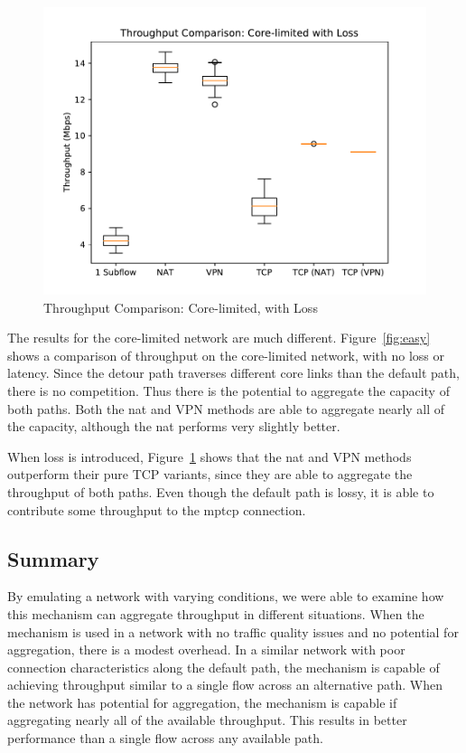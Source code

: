 \documentclass{cwru}
\begin{document}
\begin{figure}[p]
  \centering
  \includegraphics[height=0.45\textheight]{figures/lossy.pdf}
  \caption{Throughput Comparison: Core-limited, with Loss}
  \label{fig:lossy}
\end{figure}

The results for the core-limited network are much different.
Figure~\ref{fig:easy} shows a comparison of throughput on the core-limited
network, with no loss or latency. Since the detour path traverses different core
links than the default path, there is no competition. Thus there is the
potential to aggregate the capacity of both paths. Both the \ac{nat} and VPN
methods are able to aggregate nearly all of the capacity, although the \ac{nat}
performs very slightly better.

When loss is introduced, Figure~\ref{fig:lossy} shows that the \ac{nat} and VPN
methods outperform their pure TCP variants, since they are able to aggregate the
throughput of both paths. Even though the default path is lossy, it is able to
contribute some throughput to the \ac{mptcp} connection.

\subsection{Summary}

By emulating a network with varying conditions, we were able to examine how this
mechanism can aggregate throughput in different situations. When the mechanism
is used in a network with no traffic quality issues and no potential for
aggregation, there is a modest overhead. In a similar network with poor
connection characteristics along the default path, the mechanism is capable of
achieving throughput similar to a single flow across an alternative path.
When the network has potential for aggregation, the mechanism is capable if
aggregating nearly all of the available throughput. This results in better
performance than a single flow across any available path.
\end{document}
